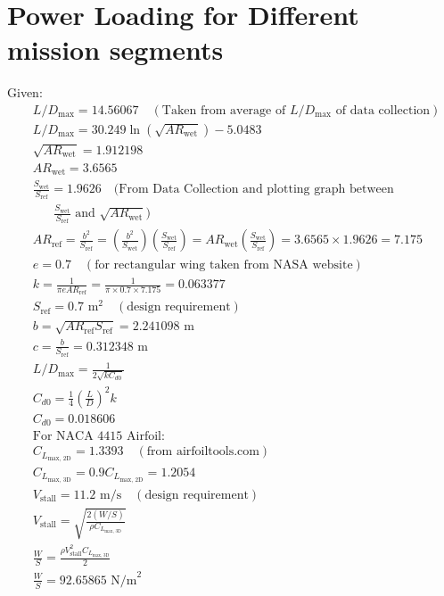 \documentclass[12 pt]{article}
\begin{document}
\section {Power Loading for Different mission segments}
Given:
\begin{align*}
& L/D_{\text{max}} = 14.56067 \quad (\text{Taken from average of } L/D_{\text{max}} \text{ of data collection}) \\
& L/D_{\text{max}} = 30.249 \ln(\sqrt{AR_{\text{wet}}}) - 5.0483 \\
& \sqrt{AR_{\text{wet}}} = 1.912198 \\
& AR_{\text{wet}} = 3.6565 \\
& \frac{S_{\text{wet}}}{S_{\text{ref}}} = 1.9626 \quad (\text{From Data Collection and plotting graph between} \\
& \quad \text{ } \frac{S_{\text{wet}}}{S_{\text{ref}}} \text{ and } \sqrt{AR_{\text{wet}}}) \\
& AR_{\text{ref}} = \frac{b^2}{S_{\text{ref}}} = \left(\frac{b^2}{S_{\text{wet}}}\right) \left(\frac{S_{\text{wet}}}{S_{\text{ref}}}\right) = AR_{\text{wet}} \left(\frac{S_{\text{wet}}}{S_{\text{ref}}}\right) = 3.6565 \times 1.9626 = 7.175 \\
& e = 0.7 \quad (\text{for rectangular wing taken from NASA website}) \\
& k = \frac{1}{\pi e AR_{\text{ref}}} = \frac{1}{\pi \times 0.7 \times 7.175} = 0.063377 \\
& S_{\text{ref}} = 0.7 \text{ m}^2 \quad (\text{design requirement}) \\
& b = \sqrt{AR_{\text{ref}} S_{\text{ref}}} = 2.241098 \text{ m} \\
& c = \frac{b}{S_{\text{ref}}} = 0.312348 \text{ m} \\
& L/D_{\text{max}} = \frac{1}{2\sqrt{k C_{d0}}} \\
& C_{d0} = \frac{1}{4} \left(\frac{L}{D}\right)^2 k \\
& C_{d0} = 0.018606 \\
& \text{For NACA 4415 Airfoil:} \\
& C_{L_{\text{max, 2D}}} = 1.3393 \quad (\text{from airfoiltools.com}) \\
& C_{L_{\text{max, 3D}}} = 0.9 C_{L_{\text{max, 2D}}} = 1.2054 \\
& V_{\text{stall}} = 11.2 \text{ m/s} \quad (\text{design requirement}) \\
& V_{\text{stall}} = \sqrt{\frac{2(W/S)}{\rho C_{L_{\text{max, 3D}}}}} \\
& \frac{W}{S} = \frac{\rho V_{\text{stall}}^2 C_{L_{\text{max, 3D}}}}{2} \\
& \frac{W}{S} = 92.65865 \text{ N/m}^2 \\
\end{align*}
\end{document}
